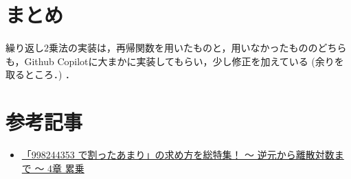 \documentclass[slide,20pt]{ltjsarticle}
\begin{document}
\section*{まとめ}
繰り返し$2$乗法の実装は，再帰関数を用いたものと，用いなかったもののどちらも，Github Copilotに大まかに実装してもらい，少し修正を加えている (余りを取るところ．) ．

\begingroup
\let\clearpage\relax
\section*{参考記事}
\endgroup
\begin{itemize}
\item \href{https://qiita.com/drken/items/3b4fdf0a78e7a138cd9a#4-%E7%B4%AF%E4%B9%97-an}{「998244353 で割ったあまり」の求め方を総特集！ 〜 逆元から離散対数まで 〜 4章 累乗}
\end{itemize}
\end{document}
